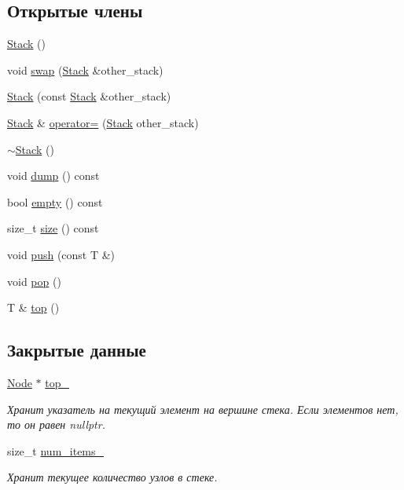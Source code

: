 \subsection*{Открытые члены}
\begin{DoxyCompactItemize}
\item 
\hyperlink{classstacks_1_1_stack_a14cd1cba325bead4ff0a91bc6eb0f6f5}{Stack} ()
\item 
void \hyperlink{classstacks_1_1_stack_af675cab8a3cd6aa3be48d79de4b54d87}{swap} (\hyperlink{classstacks_1_1_stack}{Stack} \&other\+\_\+stack)
\item 
\hyperlink{classstacks_1_1_stack_a31fcf797905470a84ec47fcd719b69a7}{Stack} (const \hyperlink{classstacks_1_1_stack}{Stack} \&other\+\_\+stack)
\item 
\hyperlink{classstacks_1_1_stack}{Stack} \& \hyperlink{classstacks_1_1_stack_a07eef6ab8e679b5720598904c2ff23b6}{operator=} (\hyperlink{classstacks_1_1_stack}{Stack} other\+\_\+stack)
\item 
\hyperlink{classstacks_1_1_stack_a40bd5dff912f0e5290777c4b46d17809}{$\sim$\+Stack} ()
\item 
void \hyperlink{classstacks_1_1_stack_aa556423ef52feaa947b2683440f2860c}{dump} () const 
\item 
bool \hyperlink{classstacks_1_1_stack_a2bd88c7b8faf901f4830ed616bf6478f}{empty} () const 
\item 
size\+\_\+t \hyperlink{classstacks_1_1_stack_a3f3772679c16de93eae9eb92e2b85955}{size} () const 
\item 
void \hyperlink{classstacks_1_1_stack_ad31b678390ac3f2076e9b757c95600be}{push} (const T \&)
\item 
void \hyperlink{classstacks_1_1_stack_a09e820f3c3531cf3f401af3b3ca5d56f}{pop} ()
\item 
T \& \hyperlink{classstacks_1_1_stack_a20e64b09239efa6340b33546115424b6}{top} ()
\end{DoxyCompactItemize}
\subsection*{Закрытые данные}
\begin{DoxyCompactItemize}
\item 
\hyperlink{structstacks_1_1_stack_1_1_node}{Node} $\ast$ \hyperlink{classstacks_1_1_stack_a68cd067db6b89353ec1f803eecd4cb74}{top\+\_\+}
\begin{DoxyCompactList}\small\item\em Хранит указатель на текущий элемент на вершине стека. Если элементов нет, то он равен nullptr. \end{DoxyCompactList}\item 
size\+\_\+t \hyperlink{classstacks_1_1_stack_a43923df95ebc551432e9d3e955c32959}{num\+\_\+items\+\_\+}
\begin{DoxyCompactList}\small\item\em Хранит текущее количество узлов в стеке. \end{DoxyCompactList}\end{DoxyCompactItemize}


